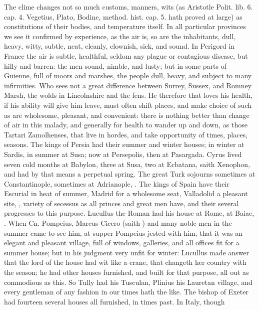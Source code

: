 {The clime changes not so much customs, manners, wits (as Aristotle
Polit. lib. 6. cap. 4. Vegetius, Plato, Bodine, method. hist. cap. 5.
hath proved at large) as constitutions of their bodies, and temperature
itself. In all particular provinces we see it confirmed by experience,
as the air is, so are the inhabitants, dull, heavy, witty, subtle,
neat, cleanly, clownish, sick, and sound. In Perigord in France
the air is subtle, healthful, seldom any plague or contagious disease,
but hilly and barren: the men sound, nimble, and lusty; but in some
parts of Guienne, full of moors and marshes, the people dull, heavy,
and subject to many infirmities. Who sees not a great difference
between Surrey, Sussex, and Romney Marsh, the wolds in Lincolnshire and
the fens. He therefore that loves his health, if his ability will give
him leave, must often shift places, and make choice of such as are
wholesome, pleasant, and convenient: there is nothing better than
change of air in this malady, and generally for health to wander up and
down, as those Tartari Zamolhenses, that live in hordes, and take
opportunity of times, places, seasons. The kings of Persia had their
summer and winter houses; in winter at Sardis, in summer at Susa; now
at Persepolis, then at Pasargada. Cyrus lived seven cold months at
Babylon, three at Susa, two at Ecbatana, saith Xenophon, and had
by that means a perpetual spring. The great Turk sojourns sometimes at
Constantinople, sometimes at Adrianople, \etc{}. The kings of Spain have
their Escurial in heat of summer, Madrid for a wholesome seat,
Valladolid a pleasant site, \etc{}, variety of secessus as all princes and
great men have, and their several progresses to this purpose. Lucullus
the Roman had his house at Rome, at Baiae, \etc{}. When Cn. Pompeius,
Marcus Cicero (saith \Plutarch) and many noble men in the summer came to
see him, at supper Pompeius jested with him, that it was an elegant and
pleasant village, full of windows, galleries, and all offices fit for a
summer house; but in his judgment very unfit for winter: Lucullus made
answer that the lord of the house had wit like a crane, that changeth
her country with the season; he had other houses furnished, and built
for that purpose, all out as commodious as this. So Tully had his
Tusculan, Plinius his Lauretan village, and every gentleman of any
fashion in our times hath the like. The bishop of Exeter had
fourteen several houses all furnished, in times past. In Italy, though
}
